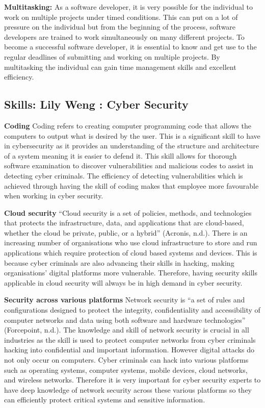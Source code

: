 \documentclass[a4paper, 11pt]{report}
\begin{document}
\textbf{Multitasking:} 
As a software developer, it is very possible for the individual to work on multiple projects under timed conditions. This can put on a lot of pressure on the individual but from the beginning of the process, software developers are trained to work simultaneously on many different projects. To become a successful software developer, it is essential to know and get use to the regular deadlines of submitting and working on multiple projects. By multitasking the individual can gain time management skills and excellent efficiency.  

\subsection{Skills: Lily Weng : Cyber Security}

\textbf{Coding}
Coding refers to creating computer programming code that allows the computers to output what is desired by the user. This is a significant skill to have in cybersecurity as it provides an understanding of the structure and architecture of a system meaning it is easier to defend it. This skill allows for thorough software examination to discover vulnerabilities and malicious codes to assist in detecting cyber criminals. The efficiency of detecting vulnerabilities which is achieved through having the skill of coding makes that employee more favourable when working in cyber security.

\textbf{Cloud security}
“Cloud security is a set of policies, methods, and technologies that protects the infrastructure, data, and applications that are cloud-based, whether the cloud be private, public, or a hybrid” (Acronis, n.d.). There is an increasing number of organisations who use cloud infrastructure to store and run applications which require protection of cloud based systems and devices. This is because cyber criminals are also advancing their skills in hacking, making organisations’ digital platforms more vulnerable. Therefore, having security skills applicable in cloud security will always be in high demand in cyber security. 

\textbf{Security across various platforms}
Network security is “a set of rules and configurations designed to protect the integrity, confidentiality and accessibility of computer networks and data using both software and hardware technologies” (Forcepoint, n.d.). The knowledge and skill of network security is crucial in all industries as the skill is used to protect computer networks from cyber criminals hacking into confidential and important information. However digital attacks do not only occur on computers. Cyber criminals can hack into various platforms such as operating systems, computer systems, mobile devices, cloud networks, and wireless networks. Therefore it is very important for cyber security experts to have deep knowledge of network security across these various platforms so they can efficiently protect critical systems and sensitive information. 
\end{document}

